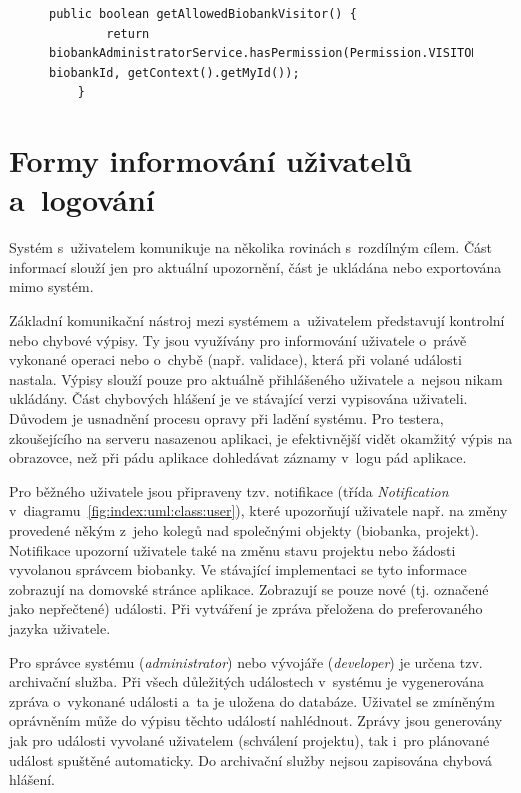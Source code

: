 \documentclass[11pt, final, oneside]{fithesis2}
\begin{document}
\begin{figure}[h!]
\centering
\begin{lstlisting}
public boolean getAllowedBiobankVisitor() {
        return biobankAdministratorService.hasPermission(Permission.VISITOR, biobankId, getContext().getMyId());
    }
\end{lstlisting}
\end{figure}

\section{Formy informování uživatelů a~logování}
Systém s~uživatelem komunikuje na několika rovinách s~rozdílným cílem. Část informací slouží jen pro aktuální upozornění, část je ukládána nebo exportována mimo systém.

Základní komunikační nástroj mezi systémem a~uživatelem představují kontrolní nebo chybové výpisy. Ty jsou využívány pro informování uživatele o~právě vykonané operaci nebo o~chybě (např. validace), která při volané události nastala. Výpisy slouží pouze pro aktuálně přihlášeného uživatele a~nejsou nikam ukládány. Část chybových hlášení je ve stávající verzi vypisována uživateli. Důvodem je usnadnění procesu opravy při ladění systému. Pro testera, zkoušejícího na serveru nasazenou aplikaci, je efektivnější vidět okamžitý výpis na obrazovce, než při pádu aplikace dohledávat záznamy v~logu pád aplikace.

Pro běžného uživatele jsou připraveny tzv. notifikace (třída \textit{Notification} v~diagramu~\ref{fig:index:uml:class:user}), které upozorňují uživatele např. na změny provedené někým z~jeho kolegů nad společnými objekty (biobanka, projekt). Notifikace upozorní uživatele také na změnu stavu projektu nebo žádosti vyvolanou správcem biobanky. Ve stávající implementaci se tyto informace zobrazují na domovské stránce aplikace. Zobrazují se pouze nové (tj. označené jako nepřečtené) události. Při vytváření je zpráva přeložena do preferovaného jazyka uživatele.

Pro správce systému (\textit{administrator}) nebo vývojáře (\textit{developer}) je určena tzv. archivační služba. Při všech důležitých událostech v~systému je vygenerována zpráva o~vykonané události a~ta je uložena do databáze. Uživatel se zmíněným oprávněním může do výpisu těchto událostí nahlédnout. Zprávy jsou generovány jak pro události vyvolané uživatelem (schválení projektu), tak i~pro plánované událost spuštěné automaticky. Do archivační služby nejsou zapisována chybová hlášení.
\end{document}
